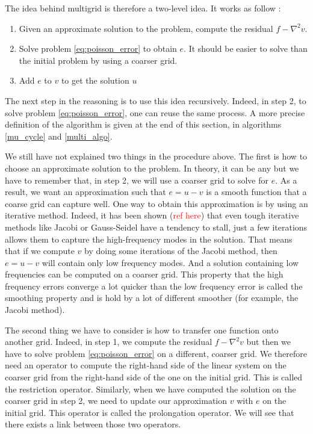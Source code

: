 The idea behind multigrid is therefore a two-level idea. It works as follow : 

\begin{enumerate}
\item Given an approximate solution to the problem, compute the residual $f-\nabla^2v$.
\item Solve problem \ref{eq:poisson_error} to obtain $e$. It should be easier to solve than the initial problem by using a coarser grid.
\item Add $e$ to $v$ to get the solution $u$ 
\end{enumerate}

The next step in the reasoning is to use this idea recursively. Indeed, in step 2, to solve problem \ref{eq:poisson_error}, one can reuse the same process. A more precise definition of the algorithm is given at the end of this section, in algorithms  \ref{mu_cycle} and \ref{multi_algo}.

We still have not explained two things in the procedure above. The first is how to choose an approximate solution to the problem. In theory, it can be any but we have to remember that, in step 2, we will use a coarser grid to solve for $e$. As a result, we want an approximation such that $e = u-v$ is a smooth function that a coarse grid can capture well. One way to obtain this approximation is by using an iterative method. Indeed, it has been shown (\textcolor{red}{ref here}) that even tough iterative methods like Jacobi or Gauss-Seidel have a tendency to stall, just a few iterations allows them to capture the high-frequency modes in the solution. That means that if we compute $v$ by doing some iterations of the Jacobi method, then $e = u-v$ will contain only low frequency modes. And a solution containing low frequencies can be computed on a coarser grid. This property that the high frequency errors converge a lot quicker than the low frequency error is called the smoothing property and is hold by a lot of different smoother (for example, the Jacobi method).

The second thing we have to consider is how to transfer one function onto another grid. Indeed, in step 1, we compute the residual $f-\nabla^2 v$ but then we have to solve problem \ref{eq:poisson_error} on a different, coarser grid. We therefore need an operator to compute the right-hand side of the linear system on the coarser grid from the right-hand side of the one on the initial grid. This is called the restriction operator. Similarly, when we have computed the solution on the coarser grid in step 2, we need to update our approximation $v$ with $e$ on the initial grid. This operator is called the prolongation operator. We will see that there exists a link between those two operators.

